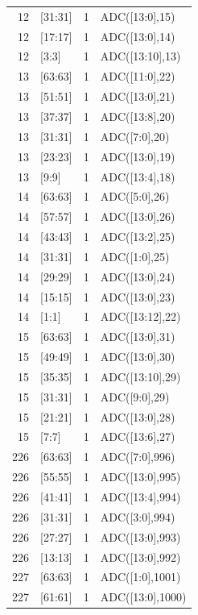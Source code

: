 \begin{longtable}{rlrl}
   12 & [31:31] &      1 &    ADC([13:0],15) \\
   12 & [17:17] &      1 &    ADC([13:0],14) \\
   12 &   [3:3] &      1 &   ADC([13:10],13) \\
   13 & [63:63] &      1 &    ADC([11:0],22) \\
   13 & [51:51] &      1 &    ADC([13:0],21) \\
   13 & [37:37] &      1 &    ADC([13:8],20) \\
   13 & [31:31] &      1 &     ADC([7:0],20) \\
   13 & [23:23] &      1 &    ADC([13:0],19) \\
   13 &   [9:9] &      1 &    ADC([13:4],18) \\
   14 & [63:63] &      1 &     ADC([5:0],26) \\
   14 & [57:57] &      1 &    ADC([13:0],26) \\
   14 & [43:43] &      1 &    ADC([13:2],25) \\
   14 & [31:31] &      1 &     ADC([1:0],25) \\
   14 & [29:29] &      1 &    ADC([13:0],24) \\
   14 & [15:15] &      1 &    ADC([13:0],23) \\
   14 &   [1:1] &      1 &   ADC([13:12],22) \\
   15 & [63:63] &      1 &    ADC([13:0],31) \\
   15 & [49:49] &      1 &    ADC([13:0],30) \\
   15 & [35:35] &      1 &   ADC([13:10],29) \\
   15 & [31:31] &      1 &     ADC([9:0],29) \\
   15 & [21:21] &      1 &    ADC([13:0],28) \\
   15 &   [7:7] &      1 &    ADC([13:6],27) \\
  226 & [63:63] &      1 &    ADC([7:0],996) \\
  226 & [55:55] &      1 &   ADC([13:0],995) \\
  226 & [41:41] &      1 &   ADC([13:4],994) \\
  226 & [31:31] &      1 &    ADC([3:0],994) \\
  226 & [27:27] &      1 &   ADC([13:0],993) \\
  226 & [13:13] &      1 &   ADC([13:0],992) \\
  227 & [63:63] &      1 &   ADC([1:0],1001) \\
  227 & [61:61] &      1 &  ADC([13:0],1000) \\

\end{longtable}
